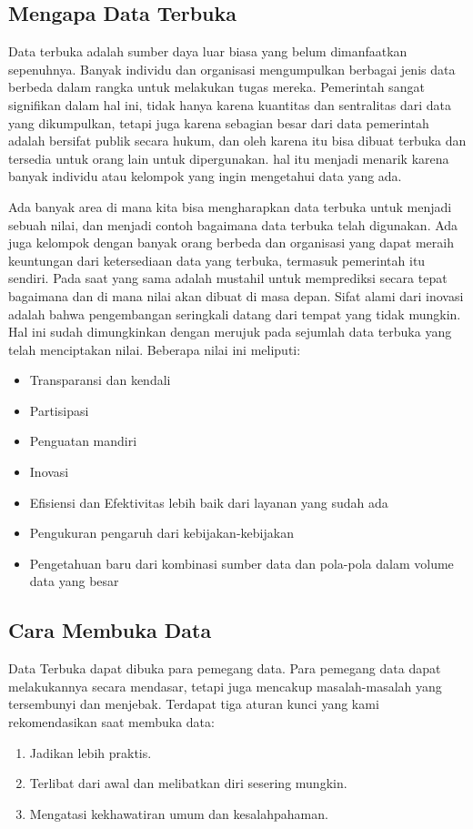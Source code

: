\subsection{Mengapa Data Terbuka}
\label{sec: Mengapa Data Terbuka}
Data terbuka adalah sumber daya luar biasa yang belum dimanfaatkan sepenuhnya. Banyak individu dan organisasi mengumpulkan berbagai jenis data berbeda dalam rangka untuk melakukan tugas mereka. Pemerintah sangat signifikan dalam hal ini, tidak hanya karena kuantitas dan sentralitas dari data yang dikumpulkan, tetapi juga karena sebagian besar dari data pemerintah adalah bersifat publik secara hukum, dan oleh karena itu bisa dibuat terbuka dan tersedia untuk orang lain untuk dipergunakan. hal itu menjadi menarik karena banyak individu atau kelompok yang ingin mengetahui data yang ada. 

Ada banyak area di mana kita bisa mengharapkan data terbuka untuk menjadi sebuah nilai, dan menjadi contoh bagaimana data terbuka telah digunakan. Ada juga kelompok dengan banyak orang berbeda dan organisasi yang dapat meraih keuntungan dari ketersediaan data yang terbuka, termasuk pemerintah itu sendiri. Pada saat yang sama adalah mustahil untuk memprediksi secara tepat bagaimana dan di mana nilai akan dibuat di masa depan. Sifat alami dari inovasi adalah bahwa pengembangan seringkali datang dari tempat yang tidak mungkin. Hal ini sudah dimungkinkan dengan merujuk pada sejumlah data terbuka yang telah menciptakan nilai. Beberapa nilai ini meliputi: 
\begin{itemize}
\item Transparansi dan kendali
\item Partisipasi
\item Penguatan mandiri
\item Inovasi
\item Efisiensi dan Efektivitas lebih baik dari layanan yang sudah ada
\item Pengukuran pengaruh dari kebijakan-kebijakan
\item Pengetahuan baru dari kombinasi sumber data dan pola-pola dalam volume data yang besar
\end{itemize}

\subsection{Cara Membuka Data}
\label{sec: Cara Membuka Data}
Data Terbuka dapat dibuka para pemegang data. Para pemegang data dapat melakukannya secara mendasar, tetapi juga mencakup masalah-masalah yang tersembunyi dan menjebak. Terdapat tiga aturan kunci yang kami rekomendasikan saat membuka data:
\begin{enumerate}
\item Jadikan lebih praktis.
\item Terlibat dari awal dan melibatkan diri sesering mungkin.
\item Mengatasi kekhawatiran umum dan kesalahpahaman. 
\end{enumerate}

